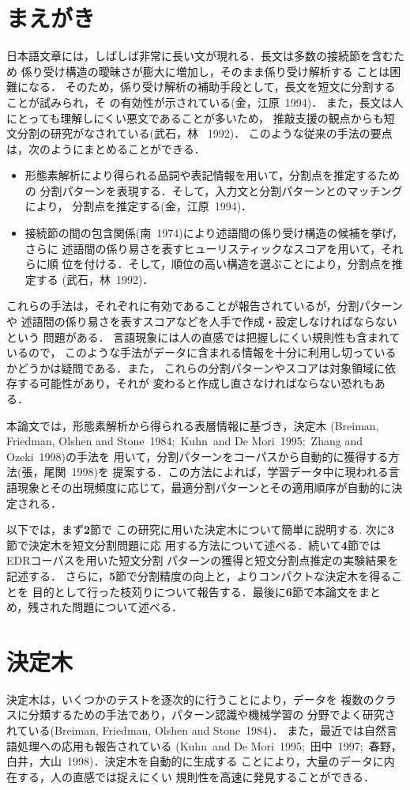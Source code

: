 \section{まえがき}
日本語文章には，しばしば非常に長い文が現れる．長文は多数の接続節を含むため
係り受け構造の曖昧さが膨大に増加し，そのまま係り受け解析する
ことは困難になる．
そのため，係り受け解析の補助手段として，長文を短文に分割することが試みられ，そ
の有効性が示されている(金，江原\ 1994)．
また，長文は人にとっても理解しにくい悪文であることが多いため，
推敲支援の観点からも短文分割の研究がなされている(武石，林 \ 1992)．
このような従来の手法の要点は，次のようにまとめることができる．
\begin{itemize}
\item 形態素解析により得られる品詞や表記情報を用いて，分割点を推定するための
分割パターンを表現する．そして，入力文と分割パターンとのマッチングにより，
分割点を推定する(金，江原\ 1994)．
\item 接続節の間の包含関係(南\ 1974)により述語間の係り受け構造の候補を挙げ，さらに
述語間の係り易さを表すヒューリスティックなスコアを用いて，それらに順
位を付ける．そして，順位の高い構造を選ぶことにより，分割点を推定する
(武石，林\ 1992)．
\end{itemize}
これらの手法は，それぞれに有効であることが報告されているが，分割パターンや
述語間の係り易さを表すスコアなどを人手で作成・設定しなければならないという
問題がある．
言語現象には人の直感では把握しにくい規則性も含まれているので，
このような手法がデータに含まれる情報を十分に利用し切っているかどうかは疑問である．また，
これらの分割パターンやスコアは対象領域に依存する可能性があり，それが
変わると作成し直さなければならない恐れもある．

本論文では，形態素解析から得られる表層情報に基づき，決定木
(Breiman, Friedman, Olshen and Stone\ 1984;\ Kuhn\ and De Mori\ 1995;\ Zhang and Ozeki\ 1998)の手法を
用いて，分割パターンをコーパスから自動的に獲得する方法(張，尾関\ 1998)を
提案する．この方法によれば，学習データ中に現われる言語現象とその出現頻度に応じて，最適分割パターンとその適用順序が自動的に決定される．

以下では，まず{\bf 2}節で
この研究に用いた決定木について簡単に説明する.
次に{\bf 3}節で決定木を短文分割問題に応
用する方法について述べる．続いて{\bf 4}節ではEDRコーパスを用いた短文分割
パターンの獲得と短文分割点推定の実験結果を記述する．
さらに，{\bf 5}節で分割精度の向上と，よりコンパクトな決定木を得ることを
目的として行った枝苅りについて報告する．最後に{\bf 6}節で本論文をまと
め，残された問題について述べる．
\section{決定木}
決定木は，いくつかのテストを逐次的に行うことにより，データを
複数のクラスに分類するための手法であり，パターン認識や機械学習の
分野でよく研究されている(Breiman, Friedman, Olshen and Stone\ 1984)．
また，最近では自然言語処理への応用も報告されている
(Kuhn\ and De Mori\ 1995;\ 田中\ 1997;\ 春野，白井，大山\ 1998)．決定木を自動的に生成する
ことにより，大量のデータに内在する，人の直感では捉えにくい
規則性を高速に発見することができる．

